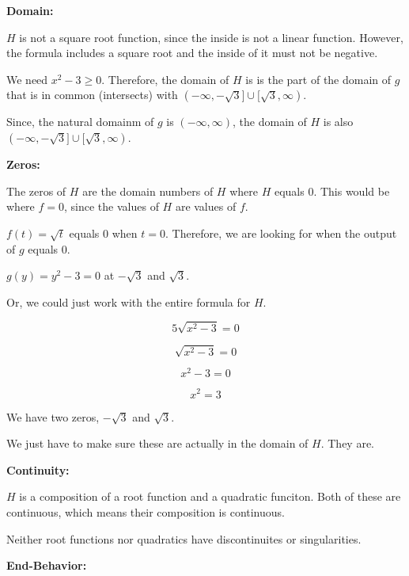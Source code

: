 \documentclass{ximera}
\begin{document}
\textbf{\textcolor{blue!55!black}{Domain:}} 


$H$ is not a square root function, since the inside is not a linear function.  However, the formula includes a square root and the inside of it must not be negative. 

We need $x^2-3 \geq 0$.  Therefore, the domain of $H$ is is the part of the domain of $g$ that is in common (intersects) with $(-\infty, -\sqrt{3} ] \cup [ \sqrt{3}, \infty)$. 

Since, the natural domainm of $g$ is $(-\infty, \infty)$, the domain of $H$ is also $(-\infty, -\sqrt{3} ] \cup [ \sqrt{3}, \infty)$. 



\textbf{\textcolor{blue!55!black}{Zeros:}} 


The zeros of $H$ are the domain numbers of $H$ where $H$ equals $0$.  This would be where $f = 0$, since the values of $H$ are values of $f$. 



$f(t) = \sqrt{t}$ equals $0$ when $t = 0$. Therefore, we are looking for when the output of $g$ equals $0$. 



$g(y) = y^2 - 3 = 0$ at $-\sqrt{3}$ and $\sqrt{3}$. 



Or, we could just work with the entire formula for $H$. 


\[
5 \sqrt{x^2-3} = 0
\]


\[
\sqrt{x^2-3} = 0
\]


\[
x^2-3 = 0
\]

\[
x^2 = 3
\]


We have two zeros, $-\sqrt{3}$ and $\sqrt{3}$. 

We just have to make sure these are actually in the domain of $H$.  They are. 






\textbf{\textcolor{blue!55!black}{Continuity:}} 


$H$ is a composition of a root function and a quadratic funciton.  Both of these are continuous, which means their composition is continuous. 

Neither root functions nor quadratics have discontinuites or singularities. 





\textbf{\textcolor{blue!55!black}{End-Behavior:}} 
\end{document}
